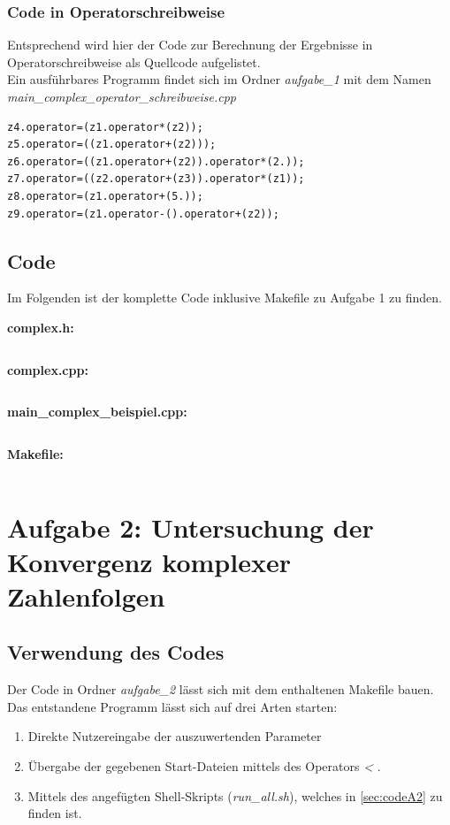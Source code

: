 \documentclass{report}
\begin{document}
\subsection{Code in Operatorschreibweise}

Entsprechend  wird hier der Code zur Berechnung der Ergebnisse in Operatorschreibweise als Quellcode aufgelistet. \\
Ein ausführbares Programm findet sich im Ordner \textit{aufgabe\_1} mit dem Namen \textit{main\_complex\_operator\_schreibweise.cpp}


\begin{lstlisting}
z4.operator=(z1.operator*(z2));
z5.operator=((z1.operator+(z2)));
z6.operator=((z1.operator+(z2)).operator*(2.));
z7.operator=((z2.operator+(z3)).operator*(z1));
z8.operator=(z1.operator+(5.));
z9.operator=(z1.operator-().operator+(z2));
\end{lstlisting}



\section{Code}\label{sec:codeA1}

Im Folgenden ist der komplette Code inklusive Makefile zu Aufgabe 1 zu finden.

\textbf{complex.h: }
\inputminted[autogobble]{C++}{complex_a1.h}

\clearpage{}
\textbf{complex.cpp: }
\inputminted[autogobble]{C++}{complex_a1.cpp}

\clearpage{}
\textbf{main\_complex\_beispiel.cpp: }
\inputminted[autogobble]{C++}{main_complex_beispiel_a1.cpp}

\clearpage{}
\textbf{Makefile: }
\inputminted[autogobble]{make}{Makefile_a1}


\chapter{Aufgabe 2: Untersuchung der Konvergenz komplexer Zahlenfolgen}

\section{Verwendung des Codes}\label{sec:verwendungA2}
Der Code in Ordner \textit{aufgabe\_2} lässt sich mit dem enthaltenen Makefile bauen.
Das entstandene Programm lässt sich auf drei Arten starten:

\begin{enumerate}
  \item Direkte Nutzereingabe der auszuwertenden Parameter
  \item Übergabe der gegebenen Start-Dateien mittels des Operators \textit{<} .
  \item Mittels des angefügten Shell-Skripts (\textit{run\_all.sh}), welches in \ref{sec:codeA2} zu finden ist.
\end{enumerate}
\end{document}
